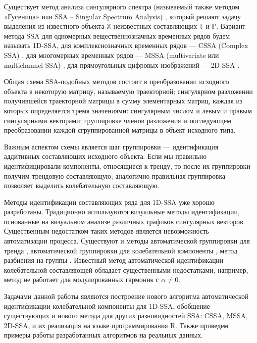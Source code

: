 \documentclass[specialist,
               substylefile = spbu.rtx,
               subf,href,colorlinks=true, 12pt]{disser}
\begin{document}
Существует метод анализа сингулярного спектра (называемый также методом «Гусеница» или SSA – Singular Spectrum Analysis) \cite{Golyandina.etal2001}, который решают задачу выделения из известного объекта $\mathbb{X}$ неизвестных составляющих $\mathbb{T}$ и $\mathbb{P}$.
Вариант метода SSA для одномерных вещественнозначных временных рядов будем называть 1D-SSA, для комплекснозначных временных рядов --- CSSA (Complex SSA) \cite{Golyandina.etal2003,Keppenne.Lall1996,Eftaxias.etal2015}, для многомерных временных рядов --- MSSA (multivariate или multichannel SSA) \cite{Golyandina.etal2003, Rssa}, для прямоугольных цифровых изображений --- 2D-SSA \cite{Golyandina.Usevich2010,Rssa}.

Общая схема SSA-подобных методов состоит в преобразовании исходного объекта в некоторую матрицу, называемую траекторной; сингулярном разложении получившейся траекторной матрицы в сумму элементарных матриц, каждая из которых определяется тремя значениями: сингулярным числом и левым и правым сингулярными векторами; группировке членов разложения и последующем преобразовании каждой сгруппированной матрицы в объект исходного типа.

Важным аспектом схемы является шаг группировки --- идентификация аддитивных составляющих исходного объекта.
Если мы правильно идентифицировали компоненты, относящиеся к тренду, то после их группировки получим трендовую составляющую;
аналогично правильная группировка позволяет выделить колебательную составляющую.

Методы идентификации составляющих ряда для 1D-SSA уже хорошо разработаны.
Традиционно используются визуальные методы идентификации, основанные на визуальном анализе различных графиков сингулярных векторов. Существенным недостатком таких методов является невозможность автоматизации процесса. Существуют и методы автоматической группировки для тренда \cite{Alexandrov2009,Golyandina.Zhigljavsky2012}, автоматической группировки для колебательной компоненты \cite{Alexandrov.Golyandina2005, Alexandrov2006}, метод разбиения на группы \cite{Golyandina.Zhigljavsky2012}. Известный метод автоматической идентификации колебательной составляющей \cite{Alexandrov.Golyandina2005} обладает существенными недостатками, например, метод не работает для модулированных гармоник с $\alpha \not = 0$.

Задачами данной работы являются построение нового алгоритма автоматической идентификации колебательной компоненты для 1D-SSA, обобщение существующих и нового метода для других разновидностей SSA: CSSA, MSSA, 2D-SSA, и их реализация на языке программирования R.
Также приведем примеры работы разработанных алгоритмов на реальных данных.
\end{document}

